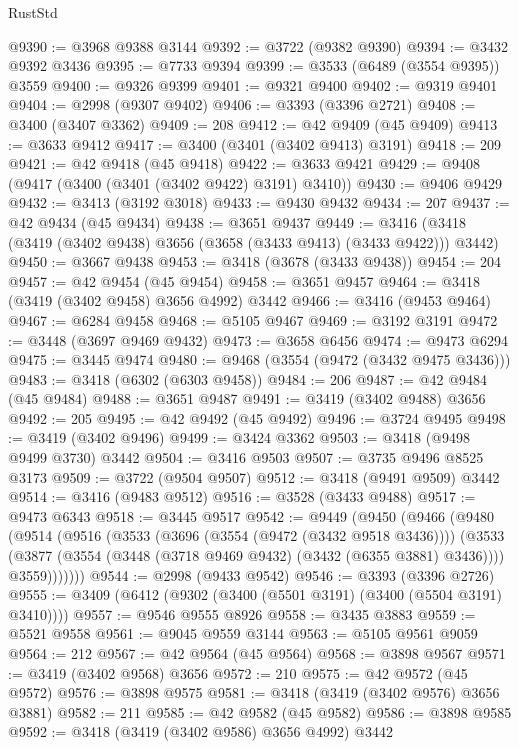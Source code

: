 \begin{lexlean}{RustStd}
\begin{coremodule}
@9390 := @3968 @9388 @3144
@9392 := @3722 (@9382 @9390)
@9394 := @3432 @9392 @3436
@9395 := @7733 @9394
@9399 := @3533 (@6489 (@3554 @9395)) @3559
@9400 := @9326 @9399
@9401 := @9321 @9400
@9402 := @9319 @9401
@9404 := @2998 (@9307 @9402)
@9406 := @3393 (@3396 @2721)
@9408 := @3400 (@3407 @3362)
@9409 := 208
@9412 := @42 @9409 (@45 @9409)
@9413 := @3633 @9412
@9417 := @3400 (@3401 (@3402 @9413) @3191)
@9418 := 209
@9421 := @42 @9418 (@45 @9418)
@9422 := @3633 @9421
@9429 := @9408 (@9417 (@3400 (@3401 (@3402 @9422) @3191) @3410))
@9430 := @9406 @9429
@9432 := @3413 (@3192 @3018)
@9433 := @9430 @9432
@9434 := 207
@9437 := @42 @9434 (@45 @9434)
@9438 := @3651 @9437
@9449 := @3416 (@3418 (@3419 (@3402 @9438) @3656 (@3658 (@3433 @9413) (@3433 @9422))) @3442)
@9450 := @3667 @9438
@9453 := @3418 (@3678 (@3433 @9438))
@9454 := 204
@9457 := @42 @9454 (@45 @9454)
@9458 := @3651 @9457
@9464 := @3418 (@3419 (@3402 @9458) @3656 @4992) @3442
@9466 := @3416 (@9453 @9464)
@9467 := @6284 @9458
@9468 := @5105 @9467
@9469 := @3192 @3191
@9472 := @3448 (@3697 @9469 @9432)
@9473 := @3658 @6456
@9474 := @9473 @6294
@9475 := @3445 @9474
@9480 := @9468 (@3554 (@9472 (@3432 @9475 @3436)))
@9483 := @3418 (@6302 (@6303 @9458))
@9484 := 206
@9487 := @42 @9484 (@45 @9484)
@9488 := @3651 @9487
@9491 := @3419 (@3402 @9488) @3656
@9492 := 205
@9495 := @42 @9492 (@45 @9492)
@9496 := @3724 @9495
@9498 := @3419 (@3402 @9496)
@9499 := @3424 @3362
@9503 := @3418 (@9498 @9499 @3730) @3442
@9504 := @3416 @9503
@9507 := @3735 @9496 @8525 @3173
@9509 := @3722 (@9504 @9507)
@9512 := @3418 (@9491 @9509) @3442
@9514 := @3416 (@9483 @9512)
@9516 := @3528 (@3433 @9488)
@9517 := @9473 @6343
@9518 := @3445 @9517
@9542 := @9449
    (@9450
      (@9466
        (@9480
          (@9514
            (@9516
              (@3533
                (@3696 (@3554 (@9472 (@3432 @9518 @3436))))
                (@3533
                  (@3877 (@3554 (@3448 (@3718 @9469 @9432) (@3432 (@6355 @3881) @3436))))
                  @3559)))))))
@9544 := @2998 (@9433 @9542)
@9546 := @3393 (@3396 @2726)
@9555 := @3409 (@6412 (@9302 (@3400 (@5501 @3191) (@3400 (@5504 @3191) @3410))))
@9557 := @9546 @9555 @8926
@9558 := @3435 @3883
@9559 := @5521 @9558
@9561 := @9045 @9559 @3144
@9563 := @5105 @9561 @9059
@9564 := 212
@9567 := @42 @9564 (@45 @9564)
@9568 := @3898 @9567
@9571 := @3419 (@3402 @9568) @3656
@9572 := 210
@9575 := @42 @9572 (@45 @9572)
@9576 := @3898 @9575
@9581 := @3418 (@3419 (@3402 @9576) @3656 @3881)
@9582 := 211
@9585 := @42 @9582 (@45 @9582)
@9586 := @3898 @9585
@9592 := @3418 (@3419 (@3402 @9586) @3656 @4992) @3442

\end{coremodule}
\end{lexlean}

